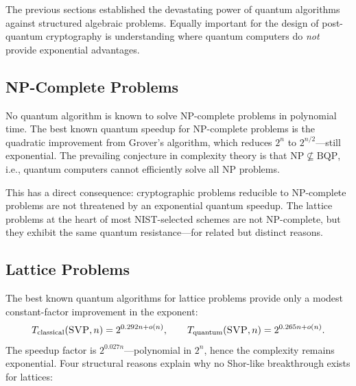 The previous sections established the devastating power of quantum algorithms against structured algebraic problems.  Equally important for the design of post-quantum cryptography is understanding where quantum computers do \emph{not} provide exponential advantages.

\subsection{NP-Complete Problems}
\label{subsec:np-complete}

No quantum algorithm is known to solve NP-complete problems in polynomial time.  The best known quantum speedup for NP-complete problems is the quadratic improvement from Grover's algorithm, which reduces $2^n$ to $2^{n/2}$---still exponential.  The prevailing conjecture in complexity theory is that $\mathrm{NP} \not\subseteq \mathrm{BQP}$, i.e., quantum computers cannot efficiently solve all NP problems.

This has a direct consequence: cryptographic problems reducible to NP-complete problems are not threatened by an exponential quantum speedup.  The lattice problems at the heart of most NIST-selected schemes are not NP-complete, but they exhibit the same quantum resistance---for related but distinct reasons.


\subsection{Lattice Problems}
\label{subsec:quantum-lattice}

The best known quantum algorithms for lattice problems provide only a modest constant-factor improvement in the exponent:
\begin{equation}
\label{eq:quantum-svp}
T_\text{classical}(\textsc{SVP}{}, n) = 2^{0.292n + o(n)}, \qquad T_\text{quantum}(\textsc{SVP}{}, n) = 2^{0.265n + o(n)}.
\end{equation}
The speedup factor is $2^{0.027n}$---polynomial in $2^n$, hence the complexity remains exponential.  Four structural reasons explain why no Shor-like breakthrough exists for lattices:

